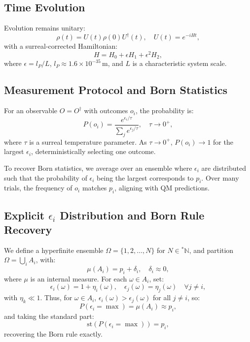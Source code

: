 \documentclass{article}
\begin{document}
\subsection{Time Evolution}
Evolution remains unitary:
\begin{equation}
\rho(t) = U(t) \rho(0) U^\dagger(t), \quad U(t) = e^{-i H t},
\end{equation}
with a surreal-corrected Hamiltonian:
\begin{equation}
H = H_0 + \epsilon H_1 + \epsilon^2 H_2,
\end{equation}
where \(\epsilon = l_P / L\), \(l_P \approx 1.6 \times 10^{-35} \, \text{m}\), and \(L\) is a characteristic system scale.

\subsection{Measurement Protocol and Born Statistics}
For an observable \(O = O^\dagger\) with outcomes \(o_i\), the probability is:
\begin{equation}
P(o_i) = \frac{e^{\epsilon_i / \tau}}{\sum_j e^{\epsilon_j / \tau}}, \quad \tau \to 0^+,
\end{equation}
where \(\tau\) is a surreal temperature parameter. As \(\tau \to 0^+\), \(P(o_i) \to 1\) for the largest \(\epsilon_i\), deterministically selecting one outcome.

To recover Born statistics, we average over an ensemble where \(\epsilon_i\) are distributed such that the probability of \(\epsilon_i\) being the largest corresponds to \(p_i\). Over many trials, the frequency of \(o_i\) matches \(p_i\), aligning with QM predictions.

\subsection{Explicit \(\epsilon_i\) Distribution and Born Rule Recovery}
We define a hyperfinite ensemble \(\Omega = \{1, 2, \dots, N\}\) for \(N \in {}^*\mathbb{N}\), and partition \(\Omega = \bigcup_i A_i\), with:
\begin{equation}
\mu(A_i) = p_i + \delta_i, \quad \delta_i \approx 0,
\end{equation}
where \(\mu\) is an internal measure. For each \(\omega \in A_i\), set:
\begin{equation}
\epsilon_i(\omega) = 1 + \eta_i(\omega), \quad \epsilon_j(\omega) = \eta_j(\omega) \quad \forall j \neq i,
\end{equation}
with \(\eta_k \ll 1\). Thus, for \(\omega \in A_i\), \(\epsilon_i(\omega) > \epsilon_j(\omega)\) for all \(j \neq i\), so:
\begin{equation}
P(\epsilon_i = \max) = \mu(A_i) \approx p_i,
\end{equation}
and taking the standard part:
\begin{equation}
\text{st}(P(\epsilon_i = \max)) = p_i,
\end{equation}
recovering the Born rule exactly.
\end{document}
